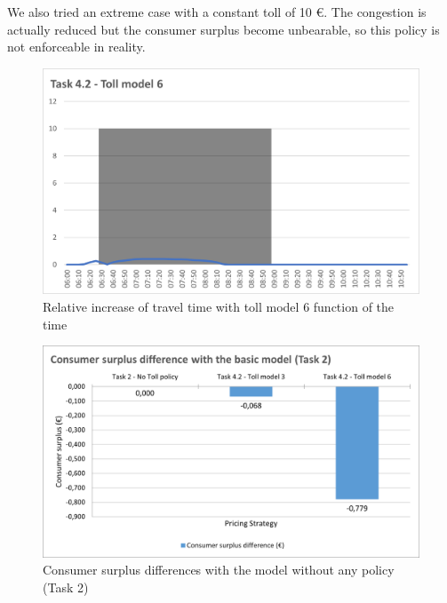 \documentclass[a4paper, 12pt,oneside]{article}
\begin{document}
We also tried an extreme case with a constant toll of 10 €. The congestion is actually reduced but the consumer surplus become unbearable, so this policy is not enforceable in reality.
\begin{minipage}[c]{0.5\textwidth}
\begin{figure}[H]
    \centering
    \includegraphics[width=1\textwidth]{Images/Step4/Task4.2_Toll_model_6.png}
    \caption{Relative increase of travel time with toll model 6 function of the time}
    \label{fig:Relative increase of travel time with toll model 6 function of the time}
\end{figure}
\end{minipage}
\begin{minipage}[c]{0.5\textwidth}
\begin{figure}[H]
    \centering
    \includegraphics[width=1\textwidth]{Images/Step4/Surplus7.png}
    \caption{Consumer surplus differences with the model without any policy (Task 2)}
    \label{fig:Consumer surplus differences with the model without any policy (Task 2) model 6}
\end{figure}
\end{minipage}
\end{document}
